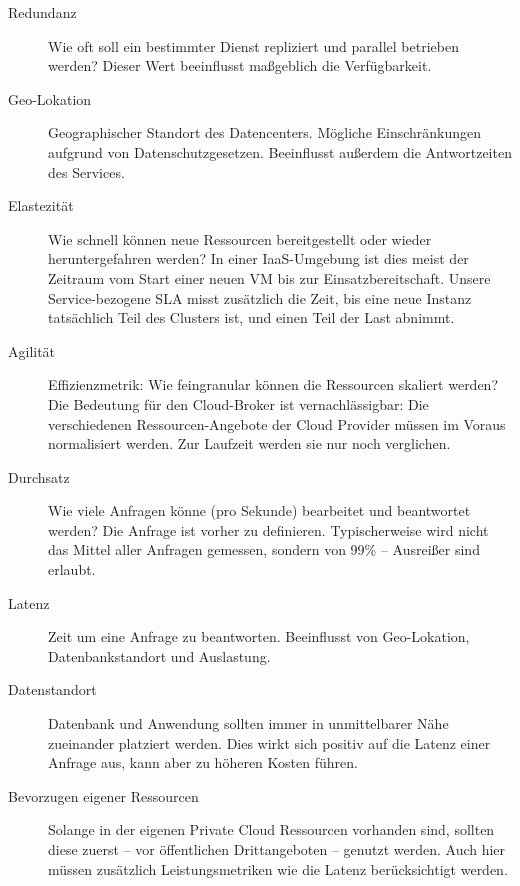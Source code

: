 \begin{description}
	

	\item[Redundanz] Wie oft soll ein bestimmter Dienst repliziert und parallel betrieben werden? Dieser Wert beeinflusst maßgeblich die Verfügbarkeit.

	
	\item[Geo-Lokation] Geographischer Standort des Datencenters. Mögliche Einschränkungen aufgrund von Datenschutzgesetzen. Beeinflusst außerdem die Antwortzeiten des Services.

	\item[Elastezität] Wie schnell können neue Ressourcen bereitgestellt oder wieder heruntergefahren werden? In einer IaaS-Umgebung ist dies meist der Zeitraum vom Start einer neuen VM bis zur Einsatzbereitschaft. Unsere Service-bezogene SLA misst zusätzlich die Zeit, bis eine neue Instanz tatsächlich Teil des Clusters ist, und einen Teil der Last abnimmt.
	
	\item[Agilität] Effizienzmetrik: Wie feingranular können die Ressourcen skaliert werden? Die Bedeutung für den Cloud-Broker ist vernachlässigbar:  Die verschiedenen Ressourcen-Angebote der Cloud Provider müssen im Voraus normalisiert werden. Zur Laufzeit werden sie nur noch verglichen.
	
	\item[Durchsatz] Wie viele Anfragen könne (pro Sekunde) bearbeitet und beantwortet werden? Die Anfrage ist vorher zu definieren. Typischerweise wird nicht das Mittel aller Anfragen gemessen, sondern von 99\% -- Ausreißer sind erlaubt.
	
	\item[Latenz] Zeit um eine Anfrage zu beantworten. Beeinflusst von Geo-Lokation, Datenbankstandort und Auslastung.
	
	\item[Datenstandort] Datenbank und Anwendung sollten immer in unmittelbarer Nähe zueinander platziert werden. Dies wirkt sich positiv auf die Latenz einer Anfrage aus, kann aber zu höheren Kosten führen.
	
	\item[Bevorzugen eigener Ressourcen] Solange in der eigenen Private Cloud Ressourcen vorhanden sind, sollten diese zuerst -- vor öffentlichen Drittangeboten -- genutzt werden. Auch hier müssen zusätzlich Leistungsmetriken wie die Latenz berücksichtigt werden.
	

\end{description}
